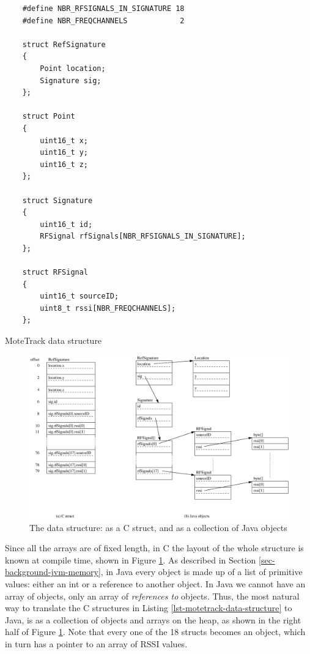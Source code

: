 \begin{listing}
\begin{verbatim}
    #define NBR_RFSIGNALS_IN_SIGNATURE 18
    #define NBR_FREQCHANNELS            2

    struct RefSignature
    {
        Point location;
        Signature sig;
    };

    struct Point
    {
        uint16_t x;
        uint16_t y;
        uint16_t z;
    };

    struct Signature
    {
        uint16_t id;
        RFSignal rfSignals[NBR_RFSIGNALS_IN_SIGNATURE];
    };

    struct RFSignal
    {
        uint16_t sourceID;
        uint8_t rssi[NBR_FREQCHANNELS];
    };
\end{verbatim}
\caption{MoteTrack  data structure}
\label{lst-motetrack-data-structure}
\end{listing}

\begin{figure}
\centering
\includegraphics[width=0.9\linewidth]{motetrack-refsignature-objects}
\caption[The  data structure]{The  data structure: as a C struct, and as a collection of Java objects}
\label{fig-motetrack-refsignature-objects}
\end{figure}

Since all the arrays are of fixed length, in C the layout of the whole structure is known at compile time, shown in Figure \ref{fig-motetrack-refsignature-objects}. As described in Section \ref{sec-background-jvm-memory}, in Java every object is made up of a list of primitive values: either an int or a reference to another object. In Java we cannot have an array of objects, only an array of \emph{references to} objects. Thus, the most natural way to translate the C structures in Listing \ref{lst-motetrack-data-structure} to Java, is as a collection of objects and arrays on the heap, as shown in the right half of Figure \ref{fig-motetrack-refsignature-objects}. Note that every one of the 18  structs becomes an object, which in turn has a pointer to an array of RSSI values.

